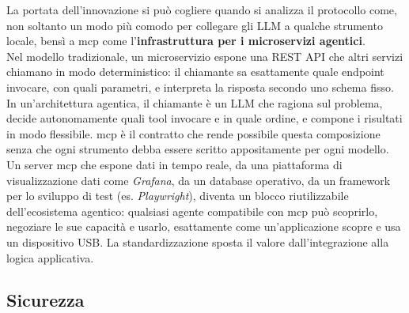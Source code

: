 La portata dell'innovazione si può cogliere quando si analizza il protocollo come, non soltanto un modo
più comodo per collegare gli LLM a qualche strumento locale, bensì a \gls{mcp} come 
l'\textbf{infrastruttura per i microservizi agentici}.\\
Nel modello tradizionale, un microservizio espone una REST API che altri servizi chiamano
in modo deterministico: il chiamante sa esattamente quale endpoint invocare, con quali
parametri, e interpreta la risposta secondo uno schema fisso. In un'architettura agentica,
il chiamante è un LLM che ragiona sul problema, decide autonomamente quali tool invocare e
in quale ordine, e compone i risultati in modo flessibile. \gls{mcp} è il contratto che rende
possibile questa composizione senza che ogni strumento debba essere scritto appositamente
per ogni modello.\\
Un server \gls{mcp} che espone dati in tempo reale, da una piattaforma di visualizzazione dati come \emph{Grafana},
da un database operativo, da un framework per lo sviluppo di test (es. \emph{Playwright}), diventa un blocco riutilizzabile
dell'ecosistema agentico: qualsiasi agente compatibile con \gls{mcp} può scoprirlo, negoziare
le sue capacità e usarlo, esattamente come un'applicazione scopre e usa un dispositivo
USB. La standardizzazione sposta il valore dall'integrazione alla
logica applicativa.

\subsection{Sicurezza}
\label{sec:mcp-sicurezza}


